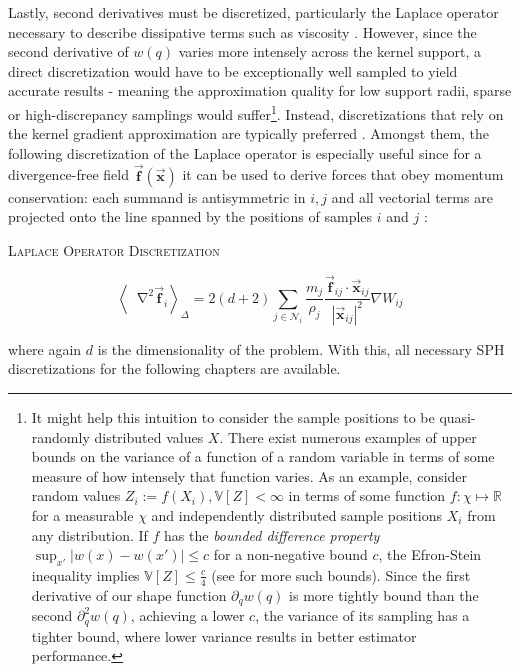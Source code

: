 \documentclass[oneside, a4paper]{book}
\newcommand{\equationnamed}[2]{%
  \setlength{\fboxsep}{2pt} %
  \setlength{\fboxrule}{0.01pt}
  \begin{center}
    \begin{minipage}{\textwidth}
      \begin{center}\textsc{#1}\end{center}
      #2
    \end{minipage}
  \end{center}
}
\newcommand\abs[1]{\left|#1\right|}
\newcommand\angled[1]{\left\langle#1\right\rangle}
\newcommand*\Laplace{\mathop{}\!\mathbin\nabla^2}
\newcommand\vek[1]{\vec{\bm{#1}}}
\begin{document}
    Lastly, second derivatives must be discretized, particularly the Laplace operator necessary to describe dissipative terms such as viscosity \autocite{price-2012}. However, since the second derivative of $w(q)$ varies more intensely across the kernel support, a direct discretization would have to be exceptionally well sampled to yield accurate results - meaning the approximation quality for low support radii, sparse or high-discrepancy samplings would suffer\footnote{It might help this intuition to consider the sample positions to be quasi-randomly distributed values $X$. There exist numerous examples of upper bounds on the variance of a function of a random variable in terms of some measure of how intensely that function varies. As an example, consider random values $Z_i:=f(X_i), \mathds{V}[Z]<\infty$ in terms of some function $f:\chi\mapsto\mathds{R}$ for a measurable $\chi$ and independently distributed sample positions $X_i$ from any distribution. If $f$ has the \textit{bounded difference property} $\sup_{x'} \abs{w(x)-w(x')}\leq c$ for a non-negative bound $c$, the Efron-Stein inequality implies $\mathds{V}[Z] \leq \frac{c}{4}$ (see \cite[Boucheron et al.]{bounded-variance} for more such bounds). Since the first derivative of our shape function $\partial_qw(q)$ is more tightly bound than the second $\partial_q^2 w(q)$, achieving a lower $c$, the variance of its sampling has a tighter bound, where lower variance results in better estimator performance.}. Instead, discretizations that rely on the kernel gradient approximation are typically preferred \autocite{tutorial2019}. Amongst them, the following discretization of the Laplace operator is especially useful since for a divergence-free field $\vek{f}(\vek{x})$ it can be used to derive forces that obey momentum conservation: each summand is antisymmetric in $i,j$ and all vectorial terms are projected onto the line spanned by the positions of samples $i$ and $j$ \autocite{tutorial2019}:
    \equationnamed{Laplace Operator Discretization}{
      \begin{equation}\label{eq:sph-laplace}
        \angled{\Laplace\vek{f}_i}_\Delta = 2(d+2)\sum_{j\in\mathcal{N}_i}\frac{m_j}{\rho_j} \frac{\vek{f}_{ij}\cdot\vek{x}_{ij}}{\abs{\vek{x}_{ij}}^2}\nabla  W_{ij}
      \end{equation}
    }
    where again $d$ is the dimensionality of the problem. With this, all necessary SPH discretizations for the following chapters are available.
\end{document}
